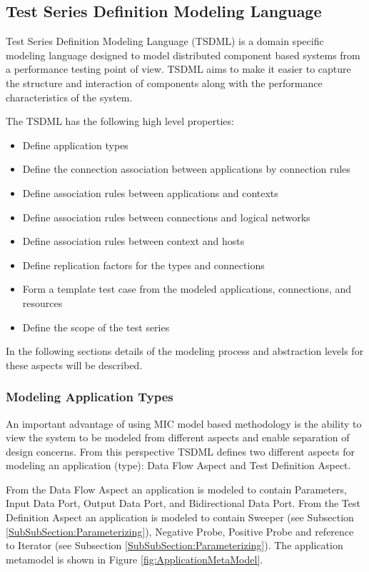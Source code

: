 \subsection {Test Series Definition Modeling Language}

Test Series Definition Modeling Language (TSDML) is a domain specific modeling language designed to model distributed component based systems from a performance testing point of view. TSDML aims to make it easier to capture the structure and interaction of components along with the performance characteristics of the system. 

The TSDML has the following high level properties:

\begin{itemize}
	\item Define application types
	\item Define the connection association between applications by connection rules
	\item Define association rules between applications and contexts
	\item Define association rules between connections and logical networks
	\item Define association rules between context and hosts
	\item Define replication factors for the types and connections
	\item Form a template test case from the modeled applications, connections, and resources
	\item Define the scope of the test series
\end{itemize}


In the following sections details of the modeling process and abstraction levels for these aspects will be described. 

\subsubsection{Modeling Application Types}
An important advantage of using MIC model based methodology is the ability to view the system to be modeled from different aspects and enable separation of design concerns. From this perspective TSDML defines two different aspects for modeling an application (type): Data Flow Aspect and Test Definition Aspect.

From the Data Flow Aspect an application is modeled to contain Parameters, Input Data Port, Output Data Port, and Bidirectional Data Port. From the Test Definition Aspect an application is modeled to contain Sweeper (see Subsection \ref{SubSubSection:Parameterizing}), Negative Probe, Positive Probe and reference to Iterator (see Subsection \ref{SubSubSection:Parameterizing}). The application metamodel is shown in Figure \ref{fig:ApplicationMetaModel}.

